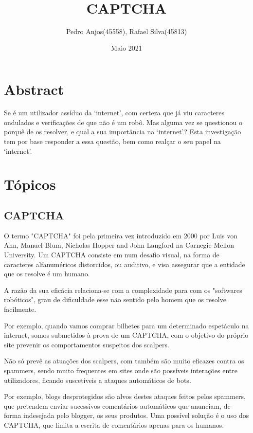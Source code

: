 \documentclass{article}
\title {CAPTCHA}
\author{Pedro Anjos(45558), Rafael Silva(45813)}
\date{Maio 2021}
\begin{document}
\maketitle

\section{Abstract}
Se é um utilizador assíduo da ‘internet’, com certeza que já viu caracteres ondulados e verificações de que não é um robô.
Mas alguma vez se questionou o porquê de os resolver, e qual a sua importância na ‘internet’? Esta investigação tem por base responder a essa questão, bem como realçar o seu papel na ‘internet’.

\section{Tópicos}
\paragraph{}
\subsection{CAPTCHA}
O termo "CAPTCHA" foi pela primeira vez introduzido em 2000 por Luis von Ahn, Manuel Blum, Nicholas Hopper and John Langford na Carnegie Mellon University. Um CAPTCHA consiste em num desafio visual, na forma de caracteres alfanuméricos distorcidos, ou auditivo, e visa assegurar que a entidade que os resolve é um humano\cite{1}. 

 	A razão da sua eficácia relaciona-se com a complexidade para com os "softwares robóticos", grau de dificuldade esse não sentido pelo homem que os resolve facilmente. 

	Por exemplo, quando vamos comprar bilhetes para um determinado espetáculo na internet, somos submetidos à prova de um CAPTCHA, com o objetivo do próprio site prevenir os comportamentos suspeitos dos scalpers. 

	Não só prevê as atuações dos scalpers, com também são muito eficazes contra os spammers, sendo muito frequentes em sites onde são possíveis interações entre utilizadores, ficando suscetíveis a ataques automáticos de bots.  

 

Por exemplo, blogs desprotegidos são alvos destes ataques feitos pelos spammers, que pretendem enviar sucessivos comentários automáticos que anunciam, de forma indesejada pelo blogger, os seus produtos. Uma possível solução é o uso dos CAPTCHA, que limita a escrita de comentários apenas para os humanos.  
\end{document}

